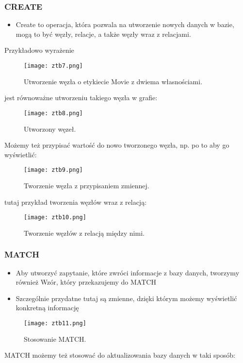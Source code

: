\documentclass[a4paper,15pt]{article}
\begin{document}
\subsubsection{CREATE}
\begin{itemize}
\item Create to operacja, która pozwala na utworzenie nowych danych w bazie, mogą to być węzły, relacje, a także węzły wraz z relacjami. 
\end{itemize}
Przykładowo wyrażenie
\begin{figure}[H]
\centering
  \texttt{[image: ztb7.png]}
  \caption{Utworzenie węzła o etykiecie Movie z dwiema własnościami.}
  \label{fig:nodes}
\end{figure}
jest równoważne utworzeniu takiego węzła w grafie:
\begin{figure}[H]
\centering
  \texttt{[image: ztb8.png]}
  \caption{Utworzony węzeł.}
  \label{fig:nodes}
\end{figure}
Możemy też przypisać wartość do nowo tworzonego węzła, np. po to aby go wyświetlić:
\begin{figure}[H]
\centering
  \texttt{[image: ztb9.png]}
  \caption{Tworzenie węzła z przypisaniem zmiennej.}
  \label{fig:nodes}
\end{figure}
tutaj przykład tworzenia węzłów wraz z relacją:
\begin{figure}[H]
\centering
  \texttt{[image: ztb10.png]}
  \caption{Tworzenie węzłów z relacją między nimi.}
  \label{fig:nodes}
\end{figure}

\subsubsection{MATCH}
\begin{itemize}
\item Aby utworzyć zapytanie, które zwróci informacje z bazy danych, tworzymy również Wzór, który przekazujemy do MATCH
\item Szczególnie przydatne tutaj są zmienne, dzięki którym możemy wyświetlić konkretną informację
\end{itemize}

\begin{figure}[H]
\centering
  \texttt{[image: ztb11.png]}
  \caption{Stosowanie MATCH.}
  \label{fig:nodes}
\end{figure}

MATCH możemy też stosować do aktualizowania bazy danych w taki sposób:
\end{document}
